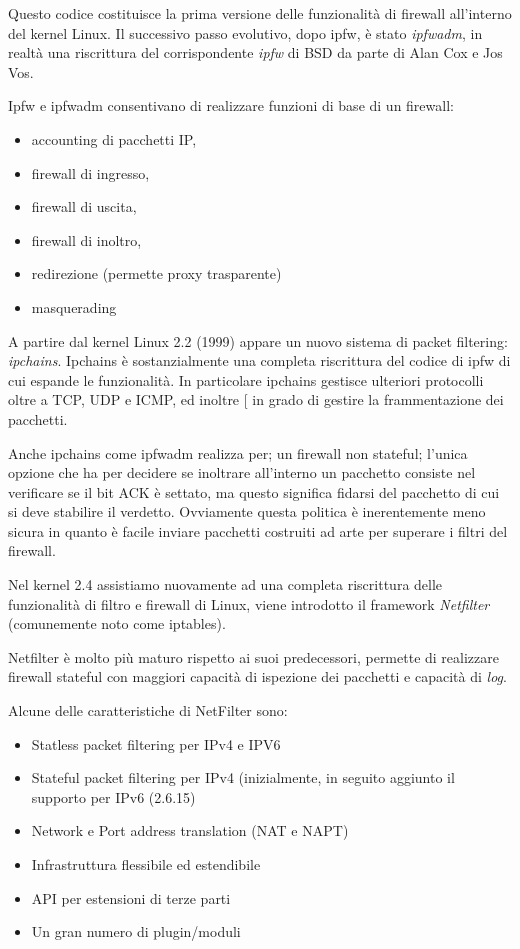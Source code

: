 Questo codice costituisce la prima versione delle funzionalità di firewall
all'interno del kernel Linux. Il successivo passo evolutivo, dopo ipfw, è
stato {\em ipfwadm}, in realtà una riscrittura del corrispondente {\em ipfw}
di BSD da parte di Alan Cox e Jos Vos.

Ipfw e ipfwadm consentivano di realizzare funzioni di base di un firewall:

\begin{itemize}
    \item accounting di pacchetti IP,
    \item firewall di ingresso,
    \item firewall di uscita,
    \item firewall di inoltro,
    \item redirezione (permette proxy trasparente)
    \item masquerading
\end{itemize}

A partire dal kernel Linux 2.2 (1999) appare un nuovo sistema di packet
filtering: {\em ipchains}. Ipchains \`e sostanzialmente una completa
riscrittura del codice di ipfw di cui espande le funzionalità.  In particolare
ipchains gestisce ulteriori protocolli oltre a TCP, UDP e ICMP, ed inoltre [
in grado di gestire la frammentazione dei pacchetti.

Anche ipchains come ipfwadm realizza per; un firewall non stateful; l'unica
opzione che ha per decidere se inoltrare all'interno un pacchetto consiste nel
verificare se il bit ACK \`e settato, ma questo significa fidarsi del
pacchetto di cui si deve stabilire il verdetto.
Ovviamente questa politica è inerentemente meno sicura in quanto è facile
inviare pacchetti costruiti ad arte per superare i filtri del firewall.

Nel kernel 2.4 assistiamo nuovamente ad una completa riscrittura delle
funzionalità di filtro e firewall di Linux, viene introdotto il framework {\em
Netfilter} (comunemente noto come iptables).

Netfilter è molto più maturo rispetto ai suoi predecessori, permette di
realizzare firewall stateful con maggiori capacità di ispezione dei pacchetti
e capacità di {\em log}.

Alcune delle caratteristiche di NetFilter sono:

\begin{itemize}
    \item Statless packet filtering per IPv4 e IPV6
    \item Stateful packet filtering per IPv4 (inizialmente, in seguito
        aggiunto il supporto per IPv6 (2.6.15)
    \item Network e Port address translation (NAT e NAPT)
    \item Infrastruttura flessibile ed estendibile
    \item API per estensioni di terze parti
    \item Un gran numero di plugin/moduli
\end{itemize}

